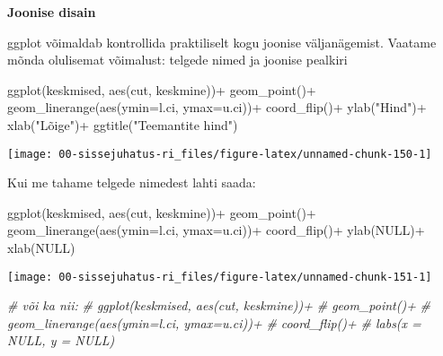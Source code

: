 \documentclass[
]{book}
\newenvironment{Shaded}{\begin{snugshade}}{\end{snugshade}}
\newcommand{\AttributeTok}[1]{\textcolor[rgb]{0.77,0.63,0.00}{#1}}
\newcommand{\CommentTok}[1]{\textcolor[rgb]{0.56,0.35,0.01}{\textit{#1}}}
\newcommand{\ConstantTok}[1]{\textcolor[rgb]{0.00,0.00,0.00}{#1}}
\newcommand{\FunctionTok}[1]{\textcolor[rgb]{0.00,0.00,0.00}{#1}}
\newcommand{\NormalTok}[1]{#1}
\newcommand{\SpecialCharTok}[1]{\textcolor[rgb]{0.00,0.00,0.00}{#1}}
\newcommand{\StringTok}[1]{\textcolor[rgb]{0.31,0.60,0.02}{#1}}
\begin{document}
\textbf{Joonise disain}

ggplot võimaldab kontrollida praktiliselt kogu joonise väljanägemist. Vaatame mõnda olulisemat võimalust: telgede nimed ja joonise pealkiri

\begin{Shaded}
\begin{Highlighting}[]
\FunctionTok{ggplot}\NormalTok{(keskmised, }\FunctionTok{aes}\NormalTok{(cut, keskmine))}\SpecialCharTok{+}
  \FunctionTok{geom\_point}\NormalTok{()}\SpecialCharTok{+}
  \FunctionTok{geom\_linerange}\NormalTok{(}\FunctionTok{aes}\NormalTok{(}\AttributeTok{ymin=}\NormalTok{l.ci, }\AttributeTok{ymax=}\NormalTok{u.ci))}\SpecialCharTok{+}
  \FunctionTok{coord\_flip}\NormalTok{()}\SpecialCharTok{+}
  \FunctionTok{ylab}\NormalTok{(}\StringTok{"Hind"}\NormalTok{)}\SpecialCharTok{+}
  \FunctionTok{xlab}\NormalTok{(}\StringTok{"Lõige"}\NormalTok{)}\SpecialCharTok{+}
  \FunctionTok{ggtitle}\NormalTok{(}\StringTok{"Teemantite hind"}\NormalTok{)}
\end{Highlighting}
\end{Shaded}

\begin{center}\texttt{[image: 00-sissejuhatus-ri\_files/figure-latex/unnamed-chunk-150-1]} \end{center}

Kui me tahame telgede nimedest lahti saada:

\begin{Shaded}
\begin{Highlighting}[]
\FunctionTok{ggplot}\NormalTok{(keskmised, }\FunctionTok{aes}\NormalTok{(cut, keskmine))}\SpecialCharTok{+}
  \FunctionTok{geom\_point}\NormalTok{()}\SpecialCharTok{+}
  \FunctionTok{geom\_linerange}\NormalTok{(}\FunctionTok{aes}\NormalTok{(}\AttributeTok{ymin=}\NormalTok{l.ci, }\AttributeTok{ymax=}\NormalTok{u.ci))}\SpecialCharTok{+}
  \FunctionTok{coord\_flip}\NormalTok{()}\SpecialCharTok{+}
  \FunctionTok{ylab}\NormalTok{(}\ConstantTok{NULL}\NormalTok{)}\SpecialCharTok{+}
  \FunctionTok{xlab}\NormalTok{(}\ConstantTok{NULL}\NormalTok{)}
\end{Highlighting}
\end{Shaded}

\begin{center}\texttt{[image: 00-sissejuhatus-ri\_files/figure-latex/unnamed-chunk-151-1]} \end{center}

\begin{Shaded}
\begin{Highlighting}[]
\CommentTok{\# või ka nii:}
\CommentTok{\# ggplot(keskmised, aes(cut, keskmine))+}
\CommentTok{\#   geom\_point()+}
\CommentTok{\#   geom\_linerange(aes(ymin=l.ci, ymax=u.ci))+}
\CommentTok{\#   coord\_flip()+}
\CommentTok{\#   labs(x = NULL, y = NULL)}
\end{Highlighting}
\end{Shaded}
\end{document}
